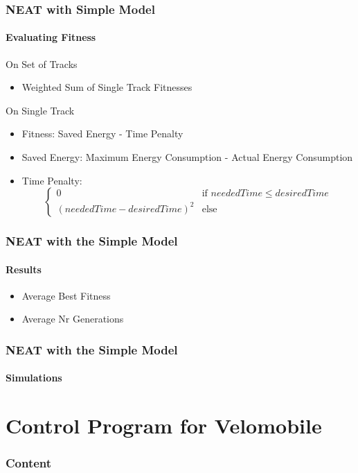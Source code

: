 \documentclass[8pt]{beamer}
\begin{document}
\begin{frame}
	\frametitle{NEAT with Simple Model}
	\framesubtitle{Evaluating Fitness}
	\begin{block}{On Set of Tracks}
		\begin{itemize}
			\item Weighted Sum of Single Track Fitnesses
		\end{itemize}
	\end{block}
	\pause
	\begin{block}{On Single Track}
		\begin{itemize}		
			\item Fitness: Saved Energy - Time Penalty
			\item Saved Energy: Maximum Energy Consumption - Actual Energy Consumption
			\item Time Penalty: \[\left\{ 
				\begin{array}{ll}
					0  & \mbox{if } neededTime \leq desiredTime \\
					(neededTime - desiredTime)^2 & \mbox{else } 
				\end{array}			
			\right. \]			
		\end{itemize}
	\end{block}	
\end{frame}

\begin{frame}
	\frametitle{NEAT with the Simple Model}
	\framesubtitle{Results}
	\begin{itemize}
		\item Average Best Fitness
		\item Average Nr Generations
	\end{itemize}
\end{frame}

\begin{frame}
	\frametitle{NEAT with the Simple Model}
	\framesubtitle{Simulations}
\end{frame}


\section{Control Program for Velomobile}
\begin{frame}
	\frametitle{Content}
\end{frame}
\end{document}
